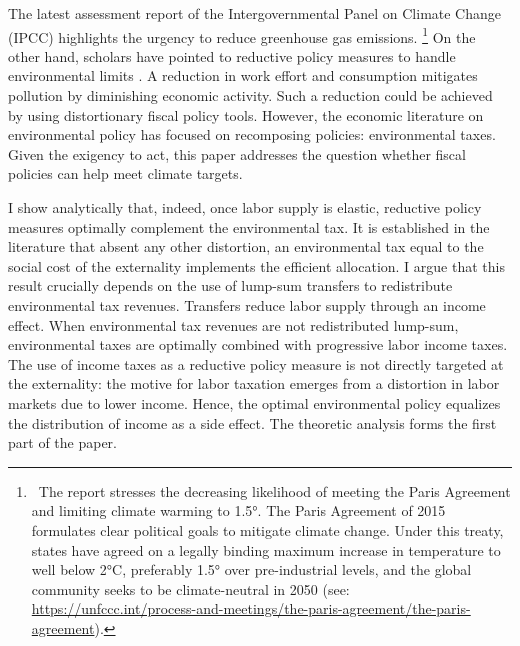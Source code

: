The latest assessment report of the Intergovernmental Panel on Climate Change (IPCC) \citep{IPCC2022} highlights the urgency to reduce greenhouse gas emissions.%
\footnote{ \  The report stresses the decreasing likelihood of meeting the Paris Agreement and limiting climate warming to 1.5°. The Paris Agreement of 2015 formulates clear political goals to mitigate climate change. Under this treaty, states have agreed on a legally binding maximum increase in temperature to well below 2°C, preferably 1.5° over pre-industrial levels, and the global community seeks to be climate-neutral in 2050  (see: \url{https://unfccc.int/process-and-meetings/the-paris-agreement/the-paris-agreement}). 
}
On the other hand, scholars have pointed to reductive policy measures to handle environmental limits \citep{Arrow2004AreMuch, Schor2005SustainableReduction, Dasgupta2021}. A reduction in work effort and consumption mitigates pollution by diminishing economic activity. Such a reduction could be achieved by using distortionary fiscal policy tools.
However, the economic literature on environmental policy has focused on  recomposing policies: environmental taxes. %
Given the exigency to act, this paper addresses the question whether fiscal policies can help meet climate targets.

I show analytically that, indeed, once 
labor supply is elastic, reductive policy measures optimally complement the environmental tax. 
It is established in the literature that absent any other distortion, an environmental tax equal to the social cost of the externality implements the efficient allocation. 
I argue that this result crucially depends on the use of lump-sum transfers to redistribute environmental tax revenues. Transfers reduce labor supply through an income effect. %
When environmental tax revenues are not redistributed lump-sum, environmental taxes are optimally combined with progressive labor income taxes. The use of income taxes as a reductive policy measure is not directly targeted at the externality: the motive for labor taxation emerges from a distortion in labor markets due to lower income. Hence,  %
the optimal environmental policy equalizes the distribution of income as  a side effect. The theoretic analysis forms the first part of the paper.

